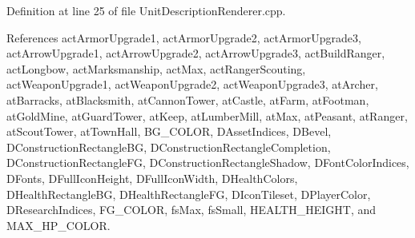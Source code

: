 Definition at line 25 of file Unit\+Description\+Renderer.\+cpp.



References act\+Armor\+Upgrade1, act\+Armor\+Upgrade2, act\+Armor\+Upgrade3, act\+Arrow\+Upgrade1, act\+Arrow\+Upgrade2, act\+Arrow\+Upgrade3, act\+Build\+Ranger, act\+Longbow, act\+Marksmanship, act\+Max, act\+Ranger\+Scouting, act\+Weapon\+Upgrade1, act\+Weapon\+Upgrade2, act\+Weapon\+Upgrade3, at\+Archer, at\+Barracks, at\+Blacksmith, at\+Cannon\+Tower, at\+Castle, at\+Farm, at\+Footman, at\+Gold\+Mine, at\+Guard\+Tower, at\+Keep, at\+Lumber\+Mill, at\+Max, at\+Peasant, at\+Ranger, at\+Scout\+Tower, at\+Town\+Hall, B\+G\+\_\+\+C\+O\+L\+OR, D\+Asset\+Indices, D\+Bevel, D\+Construction\+Rectangle\+BG, D\+Construction\+Rectangle\+Completion, D\+Construction\+Rectangle\+FG, D\+Construction\+Rectangle\+Shadow, D\+Font\+Color\+Indices, D\+Fonts, D\+Full\+Icon\+Height, D\+Full\+Icon\+Width, D\+Health\+Colors, D\+Health\+Rectangle\+BG, D\+Health\+Rectangle\+FG, D\+Icon\+Tileset, D\+Player\+Color, D\+Research\+Indices, F\+G\+\_\+\+C\+O\+L\+OR, fs\+Max, fs\+Small, H\+E\+A\+L\+T\+H\+\_\+\+H\+E\+I\+G\+HT, and M\+A\+X\+\_\+\+H\+P\+\_\+\+C\+O\+L\+OR.


